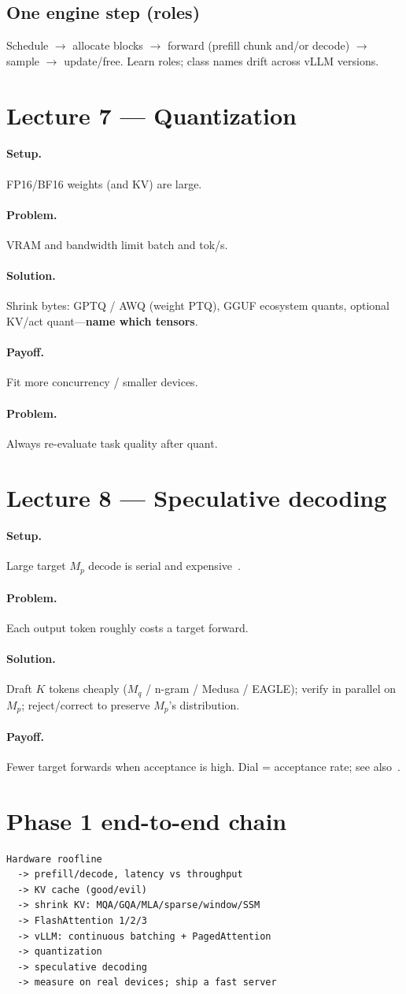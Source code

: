 \documentclass[11pt,a4paper]{article}
\newcommand{\setup}{\paragraph{Setup.}}
\newcommand{\problem}{\paragraph{Problem.}}
\newcommand{\solution}{\paragraph{Solution.}}
\newcommand{\payoff}{\paragraph{Payoff.}}
\begin{document}
\subsection{One engine step (roles)}
Schedule $\rightarrow$ allocate blocks $\rightarrow$ forward (prefill chunk and/or decode) $\rightarrow$ sample $\rightarrow$ update/free.
Learn roles; class names drift across vLLM versions.

\section{Lecture 7 --- Quantization}
\setup FP16/BF16 weights (and KV) are large.
\problem VRAM and bandwidth limit batch and tok/s.
\solution Shrink bytes: GPTQ / AWQ (weight PTQ), GGUF ecosystem quants, optional KV/act quant---\textbf{name which tensors}.
\payoff Fit more concurrency / smaller devices.
\problem Always re-evaluate task quality after quant.

\section{Lecture 8 --- Speculative decoding}
\setup Large target $M_p$ decode is serial and expensive~\cite{leviathan2023speculative}.
\problem Each output token roughly costs a target forward.
\solution Draft $K$ tokens cheaply ($M_q$ / n-gram / Medusa / EAGLE); verify in parallel on $M_p$; reject/correct to preserve $M_p$'s distribution.
\payoff Fewer target forwards when acceptance is high.
Dial = acceptance rate; see also~\cite{vizuara-spec}.

\section{Phase 1 end-to-end chain}
\begin{lstlisting}[basicstyle=\ttfamily\small,frame=single]
Hardware roofline
  -> prefill/decode, latency vs throughput
  -> KV cache (good/evil)
  -> shrink KV: MQA/GQA/MLA/sparse/window/SSM
  -> FlashAttention 1/2/3
  -> vLLM: continuous batching + PagedAttention
  -> quantization
  -> speculative decoding
  -> measure on real devices; ship a fast server
\end{lstlisting}
\end{document}
